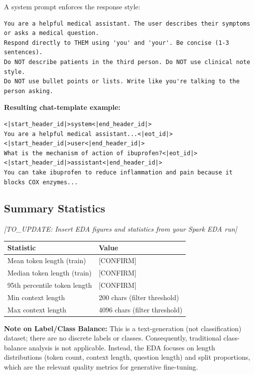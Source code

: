 \documentclass[11pt,a4paper]{article}
\begin{document}
A system prompt enforces the response style:
\begin{lstlisting}
You are a helpful medical assistant. The user describes their symptoms or asks a medical question.
Respond directly to THEM using 'you' and 'your'. Be concise (1-3 sentences).
Do NOT describe patients in the third person. Do NOT use clinical note style.
Do NOT use bullet points or lists. Write like you're talking to the person asking.
\end{lstlisting}

\textbf{Resulting chat-template example:}
\begin{lstlisting}
<|start_header_id|>system<|end_header_id|>
You are a helpful medical assistant...<|eot_id|>
<|start_header_id|>user<|end_header_id|>
What is the mechanism of action of ibuprofen?<|eot_id|>
<|start_header_id|>assistant<|end_header_id|>
You can take ibuprofen to reduce inflammation and pain because it blocks COX enzymes...
\end{lstlisting}

\subsection{Summary Statistics}

\textit{[TO\_UPDATE: Insert EDA figures and statistics from your Spark EDA run]}

\begin{table}[H]
\centering
\begin{tabular}{@{}ll@{}}
\toprule
\textbf{Statistic} & \textbf{Value} \\
\midrule
Mean token length (train) & [CONFIRM] \\
Median token length (train) & [CONFIRM] \\
95th percentile token length & [CONFIRM] \\
Min context length & 200 chars (filter threshold) \\
Max context length & 4096 chars (filter threshold) \\
\bottomrule
\end{tabular}
\end{table}

\textbf{Note on Label/Class Balance:} This is a text-generation (not classification) dataset; there are no discrete labels or classes. Consequently, traditional class-balance analysis is not applicable. Instead, the EDA focuses on length distributions (token count, context length, question length) and split proportions, which are the relevant quality metrics for generative fine-tuning.
\end{document}
